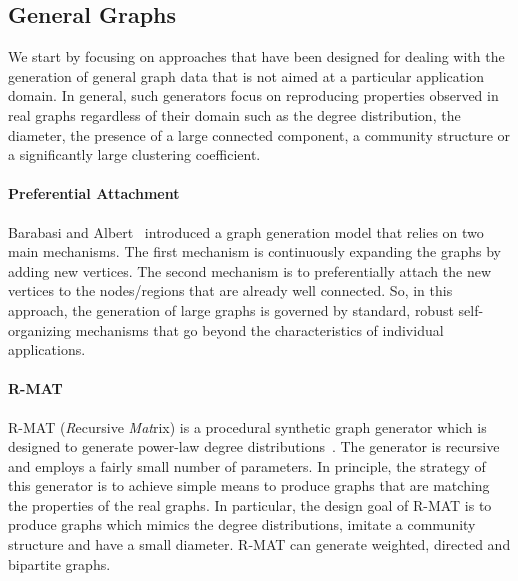 \subsection{General Graphs}
\label{sec:generators_general}

We start by focusing on approaches that have been designed for dealing with the
generation of general graph data that is not aimed at a particular application
domain. In general, such generators focus on reproducing properties observed in
real graphs regardless of their domain such as the degree distribution, the
diameter, the presence of a large connected component, a community structure or
a significantly large clustering coefficient. 



\paragraph {Preferential Attachment} Barabasi and
Albert~\cite{Barabasi99emergenceScaling} introduced a graph generation model
that relies on two main mechanisms. The first mechanism is continuously
expanding the graphs by adding new vertices. The second mechanism is to
preferentially attach the new vertices   to the nodes/regions that are already
well connected. So, in this approach, the generation of large graphs is governed
by standard, robust self-organizing mechanisms that go beyond the
characteristics of individual applications.

\paragraph {R-MAT} R-MAT (\emph{R}ecursive \emph{Mat}rix) is a procedural
synthetic graph generator which is designed to generate power-law degree
distributions~\cite{DBLP:conf/sdm/ChakrabartiZF04}.  The generator is recursive
and employs a fairly small number of parameters.  In principle, the strategy of
this generator is to achieve simple means to produce graphs that are matching
the properties of the real graphs. In particular, the design goal of R-MAT is to
produce graphs which mimics the degree distributions, imitate a community
structure and have a small diameter. R-MAT can generate weighted, directed and
bipartite graphs.


